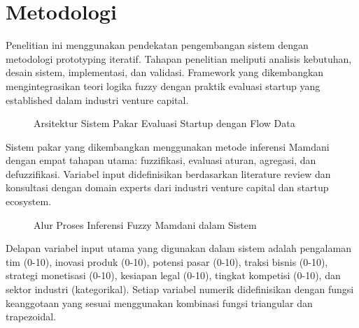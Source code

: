 \documentclass[12pt,a4paper]{article}
\begin{document}
\section{Metodologi}

Penelitian ini menggunakan pendekatan pengembangan sistem dengan metodologi prototyping iteratif. Tahapan penelitian meliputi analisis kebutuhan, desain sistem, implementasi, dan validasi. Framework yang dikembangkan mengintegrasikan teori logika fuzzy dengan praktik evaluasi startup yang established dalam industri venture capital.

\begin{figure}[htbp] %
    \centering
    \caption{Arsitektur Sistem Pakar Evaluasi Startup dengan Flow Data}
    \label{fig:architecture}
\end{figure}

Sistem pakar yang dikembangkan menggunakan metode inferensi Mamdani dengan empat tahapan utama: fuzzifikasi, evaluasi aturan, agregasi, dan defuzzifikasi. Variabel input didefinisikan berdasarkan literature review dan konsultasi dengan domain experts dari industri venture capital dan startup ecosystem.

\begin{figure}[htbp] %
    \centering
    \caption{Alur Proses Inferensi Fuzzy Mamdani dalam Sistem}
    \label{fig:fuzzy-flow}
\end{figure}

Delapan variabel input utama yang digunakan dalam sistem adalah pengalaman tim (0-10), inovasi produk (0-10), potensi pasar (0-10), traksi bisnis (0-10), strategi monetisasi (0-10), kesiapan legal (0-10), tingkat kompetisi (0-10), dan sektor industri (kategorikal). Setiap variabel numerik didefinisikan dengan fungsi keanggotaan yang sesuai menggunakan kombinasi fungsi triangular dan trapezoidal.
\end{document}
